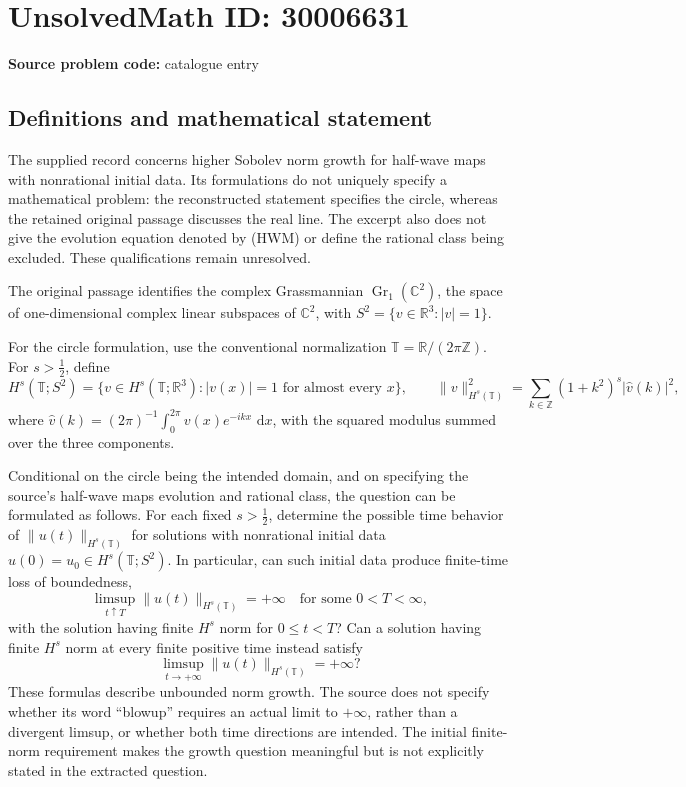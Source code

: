 \documentclass[11pt]{article}
\newcommand{\Z}{\mathbb{Z}}
\newcommand{\R}{\mathbb{R}}
\newcommand{\C}{\mathbb{C}}
\newcommand{\dd}{\,\mathrm{d}}
\begin{document}
\section*{UnsolvedMath ID: 30006631}
\textbf{Source problem code:} catalogue entry
\subsection{Definitions and mathematical statement}
The supplied record concerns higher Sobolev norm growth for half-wave maps with nonrational initial data. Its formulations do not uniquely specify a mathematical problem: the reconstructed statement specifies the circle, whereas the retained original passage discusses the real line. The excerpt also does not give the evolution equation denoted by (HWM) or define the rational class being excluded. These qualifications remain unresolved.

The original passage identifies the complex Grassmannian \(\operatorname{Gr}_1(\C^2)\), the space of one-dimensional complex linear subspaces of \(\C^2\), with \(S^2=\{v\in\R^3:|v|=1\}\).

For the circle formulation, use the conventional normalization \(\mathbb T=\R/(2\pi\Z)\). For \(s>\tfrac12\), define
\[
H^s(\mathbb T;S^2)=\{v\in H^s(\mathbb T;\R^3):|v(x)|=1\text{ for almost every }x\},
\qquad
\|v\|_{H^s(\mathbb T)}^2=\sum_{k\in\Z}(1+k^2)^s|\widehat v(k)|^2,
\]
where \(\widehat v(k)=(2\pi)^{-1}\int_0^{2\pi}v(x)e^{-ikx}\,\dd x\), with the squared modulus summed over the three components.

Conditional on the circle being the intended domain, and on specifying the source's half-wave maps evolution and rational class, the question can be formulated as follows. For each fixed \(s>\tfrac12\), determine the possible time behavior of \(\|u(t)\|_{H^s(\mathbb T)}\) for solutions with nonrational initial data \(u(0)=u_0\in H^s(\mathbb T;S^2)\). In particular, can such initial data produce finite-time loss of boundedness,
\[
\limsup_{t\uparrow T}\|u(t)\|_{H^s(\mathbb T)}=+\infty
\quad\text{for some }0<T<\infty,
\]
with the solution having finite \(H^s\) norm for \(0\leq t<T\)? Can a solution having finite \(H^s\) norm at every finite positive time instead satisfy
\[
\limsup_{t\to+\infty}\|u(t)\|_{H^s(\mathbb T)}=+\infty?
\]
These formulas describe unbounded norm growth. The source does not specify whether its word ``blowup'' requires an actual limit to \(+\infty\), rather than a divergent limsup, or whether both time directions are intended. The initial finite-norm requirement makes the growth question meaningful but is not explicitly stated in the extracted question.
\end{document}
